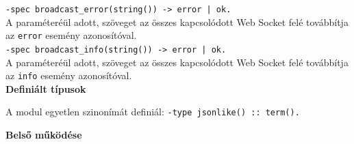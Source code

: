 \noindent \lstinline{-spec broadcast_error(string()) -> error | ok.}\\
\noindent A paraméteréül adott, szöveget az összes kapcsolódott Web Socket felé továbbítja az \lstinline{error} esemény azonosítóval.\\

\noindent \lstinline{-spec broadcast_info(string()) -> error | ok.}\\
\noindent A paraméteréül adott, szöveget az összes kapcsolódott Web Socket felé továbbítja az \lstinline{info} esemény azonosítóval.\\


\vspace{14pt}
\noindent \textbf{Definiált típusok}

\noindent A modul egyetlen szinonímát definiál:
\noindent \lstinline{-type jsonlike() :: term().}



\vspace{14pt}
\noindent \textbf{Belső működése}



